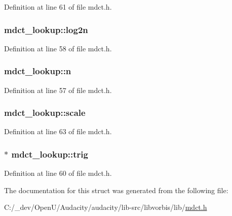 Definition at line 61 of file mdct.\+h.

\subsubsection[{\texorpdfstring{log2n}{log2n}}]{ mdct\+\_\+lookup\+::log2n}\hypertarget{structmdct__lookup_a0caa60b1e24a982eeacdbe31aeca55ab}{}\label{structmdct__lookup_a0caa60b1e24a982eeacdbe31aeca55ab}


Definition at line 58 of file mdct.\+h.

\subsubsection[{\texorpdfstring{n}{n}}]{ mdct\+\_\+lookup\+::n}\hypertarget{structmdct__lookup_a593e7827bf9dda70f513223af3169a2d}{}\label{structmdct__lookup_a593e7827bf9dda70f513223af3169a2d}


Definition at line 57 of file mdct.\+h.

\subsubsection[{\texorpdfstring{scale}{scale}}]{ mdct\+\_\+lookup\+::scale}\hypertarget{structmdct__lookup_a6072369aa974e03908b9a0d73bdb8d2d}{}\label{structmdct__lookup_a6072369aa974e03908b9a0d73bdb8d2d}


Definition at line 63 of file mdct.\+h.

\subsubsection[{\texorpdfstring{trig}{trig}}]{$\ast$ mdct\+\_\+lookup\+::trig}\hypertarget{structmdct__lookup_af94ca2b1bc4a58c9088d3abcc375c4f1}{}\label{structmdct__lookup_af94ca2b1bc4a58c9088d3abcc375c4f1}


Definition at line 60 of file mdct.\+h.



The documentation for this struct was generated from the following file\+:\begin{DoxyCompactItemize}
\item 
C\+:/\+\_\+dev/\+Open\+U/\+Audacity/audacity/lib-\/src/libvorbis/lib/\hyperlink{mdct_8h}{mdct.\+h}\end{DoxyCompactItemize}
